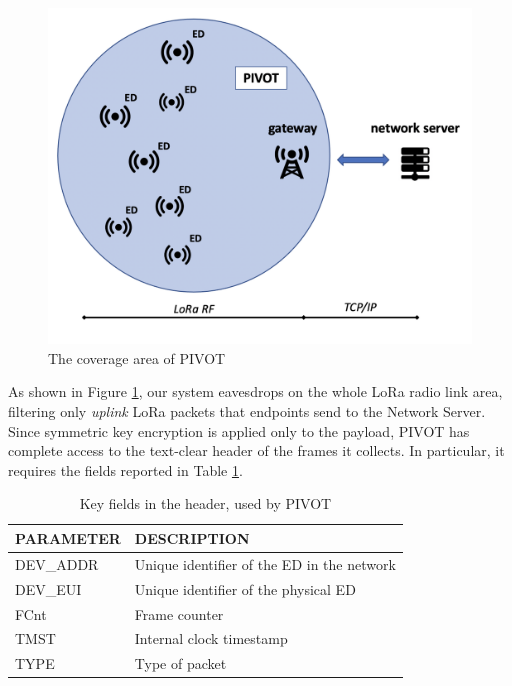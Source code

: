 \begin{figure}[H]
    \centering
    \includegraphics[width=0.7\linewidth]{images/pivot/architecture.png}
    \caption{The coverage area of PIVOT}
    \label{fig:piv_architecture}
\end{figure}
As shown in Figure \ref{fig:piv_architecture}, our system eavesdrops on the whole LoRa radio link area, filtering only \textit{uplink} LoRa packets that endpoints send to the Network Server. Since symmetric key encryption is applied only to the payload, PIVOT has complete access to the text-clear header of the frames it collects. In particular, it requires the fields reported in Table \ref{tab:keys}.
\begin{table}[h!]
    \caption{Key fields in the header, used by PIVOT}
    \label{tab:keys}
    \centering
    \begin{tabular}{|l|l|}
    \hline
        \textbf{PARAMETER} & \textbf{DESCRIPTION}                       \\ \hline
        DEV\_ADDR          & Unique identifier of the ED in the network \\ \hline
        DEV\_EUI           & Unique identifier of the physical ED       \\ \hline
	    FCnt		       & Frame counter                              \\ \hline
        TMST               & Internal clock timestamp                   \\ \hline
        TYPE               & Type of packet                             \\ \hline
    \end{tabular}
\end{table}

